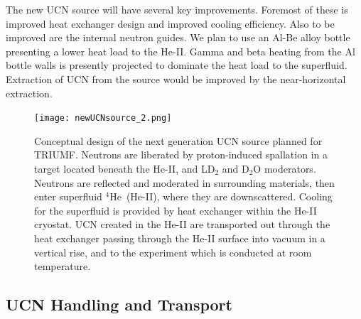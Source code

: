 The new UCN source will have several key improvements. Foremost of these
is improved heat exchanger design and improved cooling
efficiency. Also to be improved are the internal neutron guides. We
plan to use an Al-Be alloy bottle presenting a lower heat load to the
He-II. Gamma and beta heating from the Al bottle walls is presently
projected to dominate the heat load to the superfluid. Extraction of
UCN from the source would be improved by the near-horizontal
extraction.



\begin{figure}[h!]
  \centering
  \texttt{[image: newUCNsource\_2.png]}
  \caption{Conceptual design of the next generation UCN source planned
    for TRIUMF. Neutrons are liberated by proton-induced spallation in
    a target located beneath the He-II, and LD$_2$ and D$_2$O
    moderators. Neutrons are reflected and moderated in surrounding
    materials, then enter superfluid $^4$He~(He-II), where they are
    downscattered. Cooling for the superfluid is provided by heat
    exchanger within the He-II cryostat. UCN created in the He-II are
    transported out through the heat exchanger passing through the
    He-II surface into vacuum in a vertical rise, and to the
    experiment which is conducted at room temperature.}
  \label{fig:newUCNsource_2}
\end{figure}

\subsection{UCN Handling and Transport}

